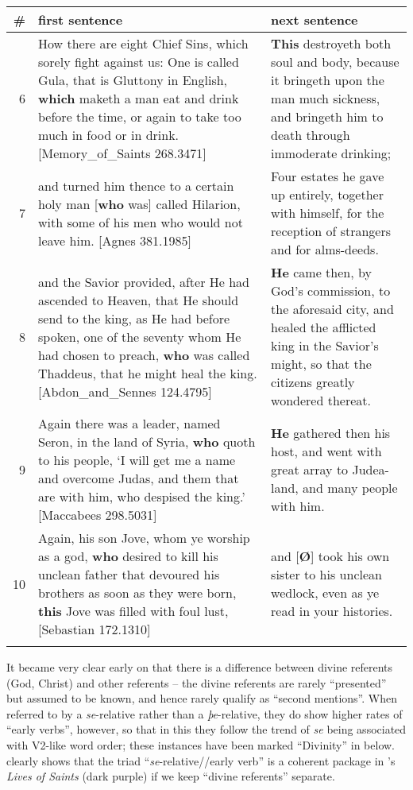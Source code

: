 \documentclass[output=paper,colorlinks,citecolor=brown]{langscibook}
\begin{document}
\begin{table}[p]
\begin{tabularx}{\textwidth}{rQQ}
\midrule
{\#} & {first sentence} & {next sentence}\\
\midrule
{6} & {How there are eight Chief Sins, which sorely fight against us: One is called Gula, that is Gluttony in English, \textbf{which} maketh a man eat and drink before the time, or again to take too much in food or in drink. [Memory\_of\_Saints 268.3471]} & {\textbf{This} destroyeth both soul and body, because it bringeth upon the man much sickness, and bringeth him to death through immoderate drinking;}\\
{7} & {and turned him thence to a certain holy man [\textbf{who} was] called Hilarion, with some of his men who would not leave him. [Agnes 381.1985]} & {Four estates he gave up entirely, together with himself, for the reception of strangers and for alms-deeds.}\\
{8} & {and the Savior provided, after He had ascended to Heaven, that He should send to the king, as He had before spoken, one of the seventy whom He had chosen to preach, \textbf{who} was called Thaddeus, that he might heal the king. [Abdon\_and\_Sennes 124.4795]} & {\textbf{He} came then, by God's commission, to the aforesaid city, and healed the afflicted king in the Savior's might, so that the citizens greatly wondered thereat.}\\
{9} & {Again there was a leader, named Seron, in the land of Syria, \textbf{who} quoth to his people, `I will get me a name and overcome Judas, and them that are with him, who despised the king.' [Maccabees 298.5031]} & {\textbf{He} gathered then his host, and went with great array to Judea-land, and many people with him.}\\
{10} & {Again, his son Jove, whom ye worship as a god, \textbf{who} desired to kill his unclean father that devoured his brothers as soon as they were born, \textbf{this} Jove was filled with foul lust, [Sebastian 172.1310]} & {and [\textbf{Ø}] took his own sister to his unclean wedlock, even as ye read in your histories.}\\
\lspbottomrule
\end{tabularx}
\end{table}


It became very clear early on that there is a difference between divine referents (God, Christ) and other referents – the divine referents are rarely “presented” but assumed to be known, and hence rarely qualify as “second mentions”. When referred to by a \textit{se}{}-relative rather than a \textit{þe}{}-relative, they do show higher rates of “early verbs”, however, so that in this they follow the trend of \textit{se} being associated with V2-like word order; these instances have been marked “Divinity” in  below.  clearly shows that the triad “\textit{se}{}-relative//early verb” is a coherent package in 's \textit{Lives of Saints} (dark purple) if we keep “divine referents” separate.
\end{document}
